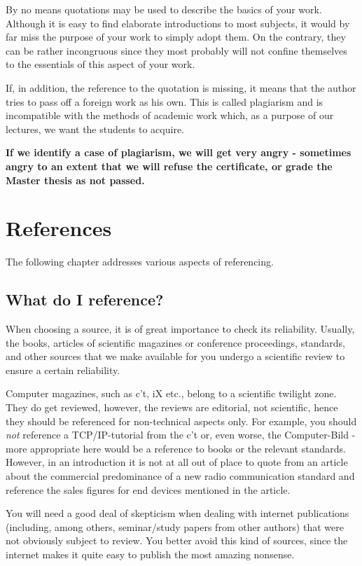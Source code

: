 By no means quotations may be used to describe the basics of your work. Although it is easy to find elaborate introductions to most subjects, it would by far miss the purpose of your work to simply adopt them. On the contrary, they can be rather incongruous since they most probably will not confine themselves to the essentials of this aspect of your work.

If, in addition, the reference to the quotation is missing, it means that the author tries to pass off a foreign work as his own. This is called plagiarism and is incompatible with the methods of academic work which, as a purpose of our lectures, we want the students to acquire.

\textbf{If we identify a case of plagiarism, we will get very angry -
   sometimes angry to an extent that we will refuse the certificate, or grade the Master thesis as not passed.}


\section{References}
\label{sec:references}
The following chapter addresses various aspects of referencing.

\subsection{What do I reference?}
When choosing a source, it is of great importance to check its reliability.
Usually, the  books, articles of scientific magazines or conference proceedings, standards, and other sources that we make available for you undergo a scientific review to ensure a certain reliability.

Computer magazines, such as c't, iX etc., belong to a scientific twilight
zone. They do get reviewed, however, the reviews are editorial, not
scientific, hence they should be referenced for non-technical aspects only.
For example, you should \emph{not} reference a TCP/IP-tutorial from the c't or,
even worse, the Computer-Bild - more appropriate here would be a reference to books
or the relevant standards. However, in an introduction it is not at all out of
place to quote from an article about the commercial predominance of a new radio
communication standard and reference the sales figures for end devices mentioned
in the article.

You will need a good deal of skepticism when dealing with internet publications (including, among others, seminar/study papers from other authors) that were not obviously subject to review. You better avoid this kind of sources, since the internet makes it quite easy to publish the most amazing nonsense.


